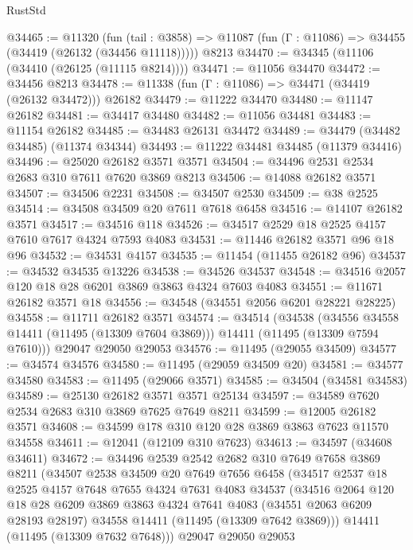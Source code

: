 \begin{lexlean}{RustStd}
\begin{coremodule}
@34465 := @11320
    (fun (tail : @3858) => @11087 (fun (Γ : @11086) => @34455 (@34419 (@26132 (@34456 @11118)))))
    @8213
@34470 := @34345 (@11106 (@34410 (@26125 (@11115 @8214))))
@34471 := @11056 @34470
@34472 := @34456 @8213
@34478 := @11338 (fun (Γ : @11086) => @34471 (@34419 (@26132 @34472))) @26182
@34479 := @11222 @34470
@34480 := @11147 @26182
@34481 := @34417 @34480
@34482 := @11056 @34481
@34483 := @11154 @26182
@34485 := @34483 @26131 @34472
@34489 := @34479 (@34482 @34485) (@11374 @34344)
@34493 := @11222 @34481 @34485 (@11379 @34416)
@34496 := @25020 @26182 @3571 @3571
@34504 := @34496 @2531 @2534 @2683 @310 @7611 @7620 @3869 @8213
@34506 := @14088 @26182 @3571
@34507 := @34506 @2231
@34508 := @34507 @2530
@34509 := @38 @2525
@34514 := @34508 @34509 @20 @7611 @7618 @6458
@34516 := @14107 @26182 @3571
@34517 := @34516 @118
@34526 := @34517 @2529 @18 @2525 @4157 @7610 @7617 @4324 @7593 @4083
@34531 := @11446 @26182 @3571 @96 @18 @96
@34532 := @34531 @4157
@34535 := @11454 (@11455 @26182 @96)
@34537 := @34532 @34535 @13226
@34538 := @34526 @34537
@34548 := @34516 @2057 @120 @18 @28 @6201 @3869 @3863 @4324 @7603 @4083
@34551 := @11671 @26182 @3571 @18
@34556 := @34548 (@34551 @2056 @6201 @28221 @28225)
@34558 := @11711 @26182 @3571
@34574 := @34514
    (@34538
      (@34556 @34558 @14411 (@11495 (@13309 @7604 @3869)))
      @14411
      (@11495 (@13309 @7594 @7610)))
    @29047
    @29050
    @29053
@34576 := @11495 (@29055 @34509)
@34577 := @34574 @34576
@34580 := @11495 (@29059 @34509 @20)
@34581 := @34577 @34580
@34583 := @11495 (@29066 @3571)
@34585 := @34504 (@34581 @34583)
@34589 := @25130 @26182 @3571 @3571 @25134
@34597 := @34589 @7620 @2534 @2683 @310 @3869 @7625 @7649 @8211
@34599 := @12005 @26182 @3571
@34608 := @34599 @178 @310 @120 @28 @3869 @3863 @7623 @11570 @34558
@34611 := @12041 (@12109 @310 @7623)
@34613 := @34597 (@34608 @34611)
@34672 := @34496
    @2539
    @2542
    @2682
    @310
    @7649
    @7658
    @3869
    @8211
    (@34507
      @2538
      @34509
      @20
      @7649
      @7656
      @6458
      (@34517
        @2537
        @18
        @2525
        @4157
        @7648
        @7655
        @4324
        @7631
        @4083
        @34537
        (@34516
          @2064
          @120
          @18
          @28
          @6209
          @3869
          @3863
          @4324
          @7641
          @4083
          (@34551 @2063 @6209 @28193 @28197)
          @34558
          @14411
          (@11495 (@13309 @7642 @3869)))
        @14411
        (@11495 (@13309 @7632 @7648)))
      @29047
      @29050
      @29053

\end{coremodule}
\end{lexlean}
